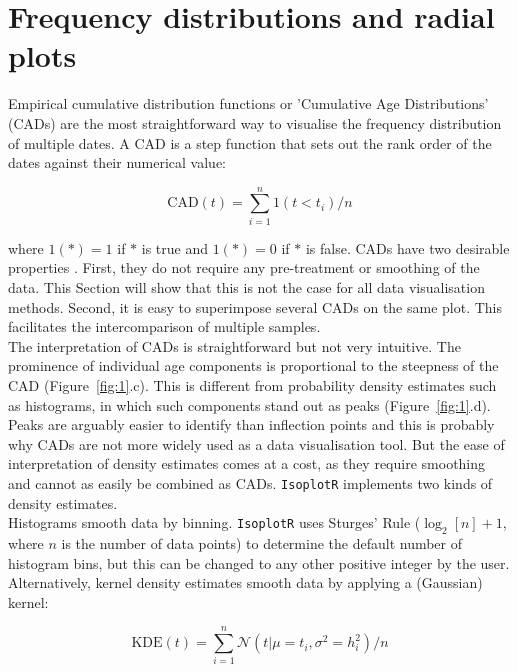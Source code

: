 \documentclass{article}
\begin{document}
\section{Frequency distributions and radial plots}
\label{sec:density}

Empirical cumulative distribution functions or 'Cumulative Age
Distributions' (CADs) are the most straightforward way to visualise
the frequency distribution of multiple dates. A CAD is a step function
that sets out the rank order of the dates against their numerical
value:

\begin{equation*}
  \mathrm{CAD}(t) = \sum_{i=1}^{n} 1(t<t_i)/n
\end{equation*}

\noindent where $1(\ast) = 1$ if $\ast$ is true and $1(\ast) = 0$ if
$\ast$ is false. CADs have two desirable properties
\citep{vermeesch2007a}.  First, they do not require any pre-treatment
or smoothing of the data.  This Section will show that this is not the
case for all data visualisation methods. Second, it is easy to
superimpose several CADs on the same plot. This facilitates the
intercomparison of multiple samples.\\

The interpretation of CADs is straightforward but not very
intuitive. The prominence of individual age components is proportional
to the steepness of the CAD (Figure~\ref{fig:1}.c). This is different
from probability density estimates such as histograms, in which such
components stand out as peaks (Figure~\ref{fig:1}.d). Peaks are
arguably easier to identify than inflection points and this is
probably why CADs are not more widely used as a data visualisation
tool. But the ease of interpretation of density estimates comes at a
cost, as they require smoothing and cannot as easily be combined as
CADs. \texttt{IsoplotR} implements two kinds of density estimates.\\

Histograms smooth data by binning. \texttt{IsoplotR} uses Sturges'
Rule ($\log_2[n]+1$, where $n$ is the number of data points) to
determine the default number of histogram bins, but this can be
changed to any other positive integer by the user. Alternatively,
kernel density estimates \citep[KDEs][]{vermeesch2012b} smooth data by
applying a (Gaussian) kernel:

\begin{equation}
  \mathrm{KDE}(t) = \sum_{i=1}^{n}\mathcal{N}\left(t | \mu=t_i,
  \sigma^2=h_i^2\right)/n
  \label{eq:KDE}
\end{equation}
\end{document}
